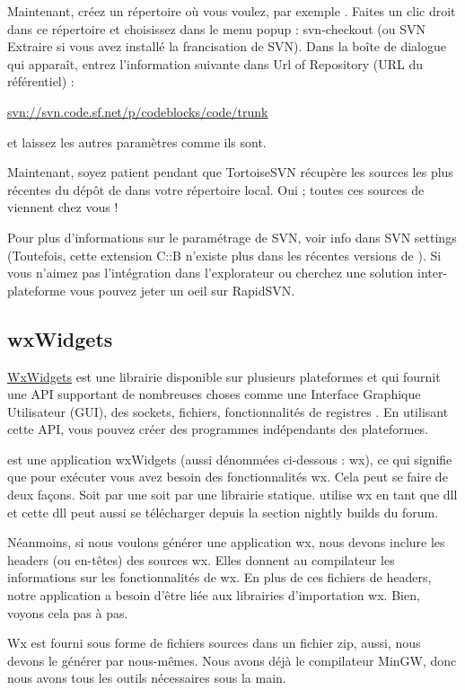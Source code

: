 Maintenant, créez un répertoire où vous voulez, par exemple . Faites un clic droit dans ce répertoire et choisissez dans le menu popup : svn-checkout (ou SVN Extraire si vous avez installé la francisation de SVN). Dans la boîte de dialogue qui apparaît, entrez l'information suivante dans Url of Repository (URL du référentiel) :

\url{svn://svn.code.sf.net/p/codeblocks/code/trunk}

et laissez les autres paramètres comme ils sont.

Maintenant, soyez patient pendant que TortoiseSVN récupère les sources les plus récentes du dépôt de \codeblocks dans votre répertoire local. Oui ; toutes ces sources de \codeblocks viennent chez vous !

Pour plus d'informations sur le paramétrage de SVN, voir info dans SVN settings (Toutefois, cette extension C::B n'existe plus dans les récentes versions de \codeblocks). Si vous n'aimez pas l'intégration dans l'explorateur ou cherchez une solution inter-plateforme vous pouvez jeter un oeil sur RapidSVN.

\subsection{wxWidgets}

\href{https://www.wxwidgets.org/}{WxWidgets} est une librairie disponible sur plusieurs plateformes et qui fournit une API supportant de nombreuses choses comme une Interface Graphique Utilisateur (GUI), des sockets, fichiers, fonctionnalités de registres \cite{url:wx}. En utilisant cette API, vous pouvez créer des programmes indépendants des plateformes.

\codeblocks est une application wxWidgets (aussi dénommées ci-dessous : wx), ce qui signifie que pour exécuter \codeblocks vous avez besoin des fonctionnalités wx. Cela peut se faire de deux façons. Soit par une  soit par une librairie statique. \codeblocks utilise wx en tant que dll et cette dll peut aussi se télécharger depuis la section nightly builds du forum.

Néanmoins, si nous voulons générer une application wx, nous devons inclure les headers (ou en-têtes) des sources wx. Elles donnent au compilateur les informations sur les fonctionnalités de wx. En plus de ces fichiers de headers, notre application a besoin d'être liée aux librairies d'importation wx. Bien, voyons cela pas à pas.

Wx est fourni sous forme de fichiers sources dans un fichier zip, aussi, nous devons le générer par nous-mêmes. Nous avons déjà le compilateur MinGW, donc nous avons tous les outils nécessaires sous la main.

